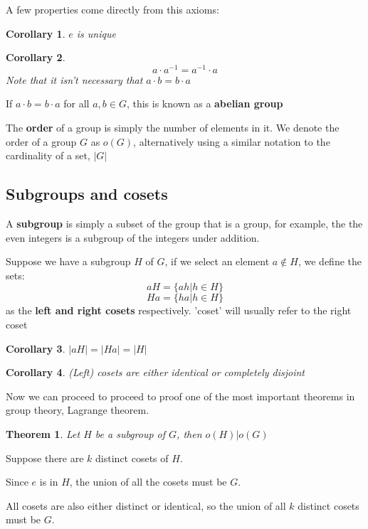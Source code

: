 \documentclass{report}
\newtheorem{theorem}{Theorem}[section]
\newtheorem{corollary}{Corollary}[theorem]
\begin{document}
A few properties come directly from this axioms:

\begin{corollary}
	$e$ is unique
\end{corollary}

\begin{corollary}
	$$a\cdot a^{-1}=a^{-1}\cdot a$$
	Note that it isn't necessary that $a\cdot b=b\cdot a$
\end{corollary}

If $a\cdot b=b\cdot a$ for all $a,b\in G$, this is known as a \textbf{abelian group}

The \textbf{order} of a group is simply the number of elements in it. We denote the order of a group $G$ as $o(G)$, alternatively using a similar notation to the cardinality of a set, $|G|$

\subsection{Subgroups and cosets}

A \textbf{subgroup} is simply a subset of the group that is a group, for example, the the even integers is a subgroup of the integers under addition.

Suppose we have a subgroup $H$ of $G$, if we select an element $a\notin H$, we define the sets:
$$aH=\{ah|h\in H\}$$
$$Ha=\{ha|h\in H\}$$
as the \textbf{left and right cosets} respectively. 'coset' will usually refer to the right coset

\begin{corollary}
	$|aH|=|Ha|=|H|$
\end{corollary}

\begin{corollary}
	(Left) cosets are either identical or completely disjoint 
\end{corollary}

Now we can proceed to proceed to proof one of the most important theorems in group theory, Lagrange theorem.

\begin{theorem}
	Let $H$ be a subgroup of $G$, then $o(H)|o(G)$
\end{theorem}

Suppose there are $k$ distinct cosets of $H$.

Since $e$ is in $H$, the union of all the cosets must be $G$.

All cosets are also either distinct or identical, so the union of all $k$ distinct cosets must be $G$.
\end{document}
